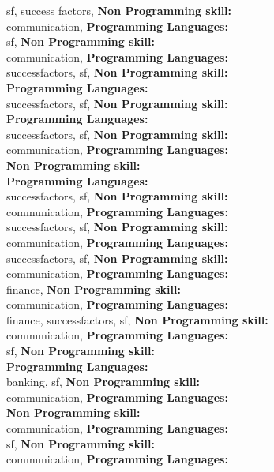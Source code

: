 sf, success factors, \textbf{Non Programming skill:} \\
communication, \textbf{Programming Languages:} \\
sf, \textbf{Non Programming skill:} \\
communication, \textbf{Programming Languages:} \\
successfactors, sf, \textbf{Non Programming skill:} \\
\textbf{Programming Languages:} \\
successfactors, sf, \textbf{Non Programming skill:} \\
\textbf{Programming Languages:} \\
successfactors, sf, \textbf{Non Programming skill:} \\
communication, \textbf{Programming Languages:} \\
\textbf{Non Programming skill:} \\
\textbf{Programming Languages:} \\
successfactors, sf, \textbf{Non Programming skill:} \\
communication, \textbf{Programming Languages:} \\
successfactors, sf, \textbf{Non Programming skill:} \\
communication, \textbf{Programming Languages:} \\
successfactors, sf, \textbf{Non Programming skill:} \\
communication, \textbf{Programming Languages:} \\
finance, \textbf{Non Programming skill:} \\
communication, \textbf{Programming Languages:} \\
finance, successfactors, sf, \textbf{Non Programming skill:} \\
communication, \textbf{Programming Languages:} \\
sf, \textbf{Non Programming skill:} \\
\textbf{Programming Languages:} \\
banking, sf, \textbf{Non Programming skill:} \\
communication, \textbf{Programming Languages:} \\
\textbf{Non Programming skill:} \\
communication, \textbf{Programming Languages:} \\
sf, \textbf{Non Programming skill:} \\
communication, \textbf{Programming Languages:} \\
